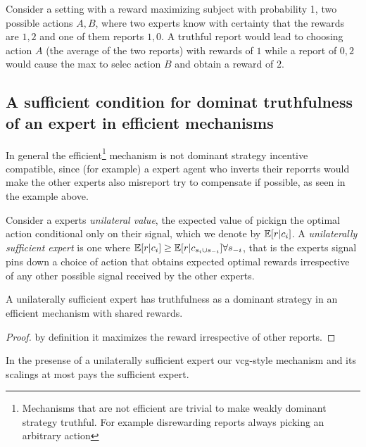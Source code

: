 \begin{eg}
	Consider a setting with a reward maximizing subject with probability 1, two possible actions ${A,B}$, where two experts know with certainty that the rewards are $1,2$ and one of them reports $1,0$. A truthful report would lead to choosing action $A$ (the average of the two reports) with rewards of $1$ while a report of $0,2$ would cause the max to selec action $B$ and obtain a reward of $2$.
\end{eg}

\subsection{A sufficient condition for dominat truthfulness of an expert in efficient mechanisms}

In general the efficient\footnote{Mechanisms that are not efficient are trivial to make weakly dominant strategy truthful. For example disrewarding reports always picking an arbitrary action} mechanism is not dominant strategy incentive compatible, since (for example) a expert agent who inverts their reporrts would make the other experts also misreport try to compensate if possible, as seen in the example above.

Consider a experts \emph{unilateral value}, the expected value of pickign the optimal action conditional only on their signal, which we denote by  $\operatorname*{\mathbb E}[ r| c_{i}]$. A \emph{unilaterally sufficient expert} is one where $\operatorname*{\mathbb E}[r|c_{i}] \geq \operatorname*{\mathbb E}[r|c_{s_i \cup s_{-i}}] \forall s_{-i}$, that is the experts signal pins down a choice of action that obtains expected optimal rewards irrespective of any other possible signal received by the other experts.

\begin{lem}
	A unilaterally sufficient expert has truthfulness as a dominant strategy in an efficient mechanism with shared rewards.
\end{lem}

\begin{proof}
    by definition it maximizes the reward irrespective of other reports.
\end{proof}

\begin{lem}
	In the presense of a unilaterally sufficient expert our vcg-style mechanism and its scalings at most pays the sufficient expert.
\end{lem}

